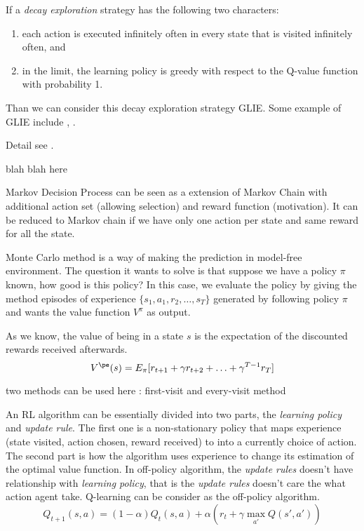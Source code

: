 \documentclass[9pt]{article}
\begin{document}
If a \textit{decay exploration} strategy has the following two characters:
\begin{enumerate}
\item each action is executed infinitely often in every state that is visited infinitely often, and
\item in the limit, the learning policy is greedy with respect to the Q-value function with probability 1.
\end{enumerate}
Than we can consider this decay exploration strategy GLIE. Some example of GLIE include , .

Detail see \cite{singh2000convergence}.

 \Working

blah blah here

Markov Decision Process can be seen as a extension of Markov Chain with additional action set (allowing selection) and reward function (motivation). It can be reduced to Markov chain if we have only one action per state and same reward for all the state.


 Monte Carlo method is a way of making the prediction in model-free environment. The question it wants to solve is that suppose we have a policy $\pi$ known, how good is this policy? In this case, we evaluate the policy by giving the method episodes of experience $\{s_1,a_1,r_2,\ldots,s_T\}$ generated by following policy $\pi$ and wants the value function $V^{\pi}$ as output.

As we know, the value of being in a state $s$ is the expectation of the discounted rewards received afterwards. 
\begin{displaymath}

  V^{\pe}(s) = E_{\pi}[r_{t+1} + \gamma r_{t+2} + \ldots + \gamma^{T-1}r_T]

\end{displaymath}

two methods can be used here : first-visit and every-visit method



An RL algorithm can be essentially divided into two parts, the \textit{learning policy} and \textit{update rule}. The first one is a non-stationary policy that maps experience (state visited, action chosen, reward received) to into a currently choice of action. The second part is how the algorithm uses experience to change its estimation of the optimal value function.
In off-policy algorithm, the \textit{update rules} doesn't have relationship with \textit{learning policy}, that is the \textit{update rules} doesn't care the what action agent take. Q-learning can be consider as the off-policy algorithm.
\begin{displaymath}
  Q_{t+1}(s,a) = (1-\alpha)Q_{t}(s,a)+\alpha(r_t+\gamma \max_{a'}Q(s',a'))
\end{displaymath}
\end{document}

